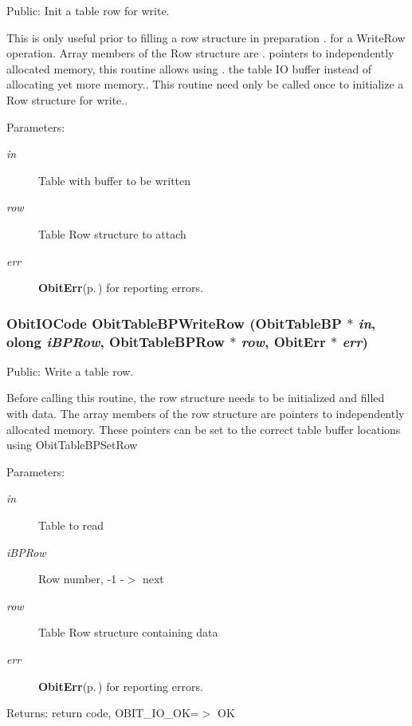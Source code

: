 Public: Init a table row for write. 

This is only useful prior to filling a row structure in preparation . for a Write\-Row operation. Array members of the Row structure are . pointers to independently allocated memory, this routine allows using . the table IO buffer instead of allocating yet more memory.. This routine need only be called once to initialize a Row structure for write.. \begin{Desc}
\item[Parameters:]
\begin{description}
\item[{\em in}]Table with buffer to be written \item[{\em row}]Table Row structure to attach \item[{\em err}]{\bf Obit\-Err}{\rm (p.\,\pageref{structObitErr})} for reporting errors. \end{description}
\end{Desc}
\subsubsection{\setlength{\rightskip}{0pt plus 5cm}Obit\-IOCode Obit\-Table\-BPWrite\-Row ({\bf Obit\-Table\-BP} $\ast$ {\em in}, {\bf olong} {\em i\-BPRow}, {\bf Obit\-Table\-BPRow} $\ast$ {\em row}, {\bf Obit\-Err} $\ast$ {\em err})}\label{ObitTableBP_8h_a20}


Public: Write a table row. 

Before calling this routine, the row structure needs to be initialized and filled with data. The array members of the row structure are pointers to independently allocated memory. These pointers can be set to the correct table buffer locations using Obit\-Table\-BPSet\-Row \begin{Desc}
\item[Parameters:]
\begin{description}
\item[{\em in}]Table to read \item[{\em i\-BPRow}]Row number, -1 -$>$ next \item[{\em row}]Table Row structure containing data \item[{\em err}]{\bf Obit\-Err}{\rm (p.\,\pageref{structObitErr})} for reporting errors. \end{description}
\end{Desc}
\begin{Desc}
\item[Returns:]return code, OBIT\_\-IO\_\-OK=$>$ OK \end{Desc}
